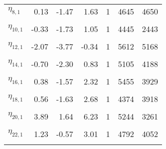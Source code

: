 \begin{longtable}[t]{lrrrrrr}
$\eta_{8, 1}$ & 0.13 & -1.47 & 1.63 & 1 & 4645 & 4650\\
\cellcolor{gray!6}{$\eta_{9, 1}$} & \cellcolor{gray!6}{-0.64} & \cellcolor{gray!6}{-3.48} & \cellcolor{gray!6}{1.85} & \cellcolor{gray!6}{1} & \cellcolor{gray!6}{3792} & \cellcolor{gray!6}{2442}\\
$\eta_{10, 1}$ & -0.33 & -1.73 & 1.05 & 1 & 4445 & 2443\\
\cellcolor{gray!6}{$\eta_{11, 1}$} & \cellcolor{gray!6}{-0.91} & \cellcolor{gray!6}{-2.31} & \cellcolor{gray!6}{0.45} & \cellcolor{gray!6}{1} & \cellcolor{gray!6}{4892} & \cellcolor{gray!6}{3696}\\
$\eta_{12, 1}$ & -2.07 & -3.77 & -0.34 & 1 & 5612 & 5168\\
\cellcolor{gray!6}{$\eta_{13, 1}$} & \cellcolor{gray!6}{1.14} & \cellcolor{gray!6}{-0.28} & \cellcolor{gray!6}{2.66} & \cellcolor{gray!6}{1} & \cellcolor{gray!6}{4393} & \cellcolor{gray!6}{3144}\\
$\eta_{14, 1}$ & -0.70 & -2.30 & 0.83 & 1 & 5105 & 4188\\
\cellcolor{gray!6}{$\eta_{15, 1}$} & \cellcolor{gray!6}{0.14} & \cellcolor{gray!6}{-2.20} & \cellcolor{gray!6}{2.41} & \cellcolor{gray!6}{1} & \cellcolor{gray!6}{4181} & \cellcolor{gray!6}{2819}\\
$\eta_{16, 1}$ & 0.38 & -1.57 & 2.32 & 1 & 5455 & 3929\\
\cellcolor{gray!6}{$\eta_{17, 1}$} & \cellcolor{gray!6}{1.25} & \cellcolor{gray!6}{-0.42} & \cellcolor{gray!6}{2.97} & \cellcolor{gray!6}{1} & \cellcolor{gray!6}{4592} & \cellcolor{gray!6}{4690}\\
$\eta_{18, 1}$ & 0.56 & -1.63 & 2.68 & 1 & 4374 & 3918\\
\cellcolor{gray!6}{$\eta_{19, 1}$} & \cellcolor{gray!6}{1.76} & \cellcolor{gray!6}{0.13} & \cellcolor{gray!6}{3.38} & \cellcolor{gray!6}{1} & \cellcolor{gray!6}{5200} & \cellcolor{gray!6}{4890}\\
$\eta_{20, 1}$ & 3.89 & 1.64 & 6.23 & 1 & 5244 & 3261\\
\cellcolor{gray!6}{$\eta_{21, 1}$} & \cellcolor{gray!6}{-0.31} & \cellcolor{gray!6}{-2.45} & \cellcolor{gray!6}{1.68} & \cellcolor{gray!6}{1} & \cellcolor{gray!6}{3894} & \cellcolor{gray!6}{2628}\\
$\eta_{22, 1}$ & 1.23 & -0.57 & 3.01 & 1 & 4792 & 4052\\
\cellcolor{gray!6}{$\eta_{23, 1}$} & \cellcolor{gray!6}{1.42} & \cellcolor{gray!6}{-0.50} & \cellcolor{gray!6}{3.44} & \cellcolor{gray!6}{1} & \cellcolor{gray!6}{5266} & \cellcolor{gray!6}{3701}\\

\end{longtable}
